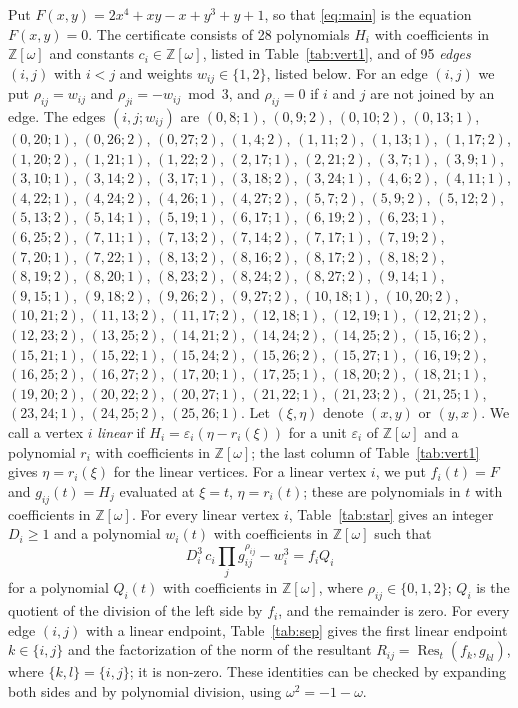 \documentclass[11pt]{article}
\newcommand{\Z}{\mathbb{Z}}
\begin{document}
Put $F(x,y)=2x^{4}+xy-x+y^{3}+y+1$, so that \eqref{eq:main} is the equation $F(x,y)=0$. The certificate consists of 28 polynomials $H_i$ with coefficients in $\Z[\omega]$ and constants $c_i\in\Z[\omega]$, listed in Table~\ref{tab:vert1}, and of 95 \emph{edges} $(i,j)$ with $i<j$ and weights $w_{ij}\in\{1,2\}$, listed below. For an edge $(i,j)$ we put $\rho_{ij}=w_{ij}$ and $\rho_{ji}=-w_{ij}\bmod 3$, and $\rho_{ij}=0$ if $i$ and $j$ are not joined by an edge.
The edges $(i,j;w_{ij})$ are $(0,8;1)$, $(0,9;2)$, $(0,10;2)$, $(0,13;1)$, $(0,20;1)$, $(0,26;2)$, $(0,27;2)$, $(1,4;2)$, $(1,11;2)$, $(1,13;1)$, $(1,17;2)$, $(1,20;2)$, $(1,21;1)$, $(1,22;2)$, $(2,17;1)$, $(2,21;2)$, $(3,7;1)$, $(3,9;1)$, $(3,10;1)$, $(3,14;2)$, $(3,17;1)$, $(3,18;2)$, $(3,24;1)$, $(4,6;2)$, $(4,11;1)$, $(4,22;1)$, $(4,24;2)$, $(4,26;1)$, $(4,27;2)$, $(5,7;2)$, $(5,9;2)$, $(5,12;2)$, $(5,13;2)$, $(5,14;1)$, $(5,19;1)$, $(6,17;1)$, $(6,19;2)$, $(6,23;1)$, $(6,25;2)$, $(7,11;1)$, $(7,13;2)$, $(7,14;2)$, $(7,17;1)$, $(7,19;2)$, $(7,20;1)$, $(7,22;1)$, $(8,13;2)$, $(8,16;2)$, $(8,17;2)$, $(8,18;2)$, $(8,19;2)$, $(8,20;1)$, $(8,23;2)$, $(8,24;2)$, $(8,27;2)$, $(9,14;1)$, $(9,15;1)$, $(9,18;2)$, $(9,26;2)$, $(9,27;2)$, $(10,18;1)$, $(10,20;2)$, $(10,21;2)$, $(11,13;2)$, $(11,17;2)$, $(12,18;1)$, $(12,19;1)$, $(12,21;2)$, $(12,23;2)$, $(13,25;2)$, $(14,21;2)$, $(14,24;2)$, $(14,25;2)$, $(15,16;2)$, $(15,21;1)$, $(15,22;1)$, $(15,24;2)$, $(15,26;2)$, $(15,27;1)$, $(16,19;2)$, $(16,25;2)$, $(16,27;2)$, $(17,20;1)$, $(17,25;1)$, $(18,20;2)$, $(18,21;1)$, $(19,20;2)$, $(20,22;2)$, $(20,27;1)$, $(21,22;1)$, $(21,23;2)$, $(21,25;1)$, $(23,24;1)$, $(24,25;2)$, $(25,26;1)$.
Let $(\xi,\eta)$ denote $(x,y)$ or $(y,x)$. We call a vertex $i$ \emph{linear} if $H_i=\varepsilon_i(\eta-r_i(\xi))$ for a unit $\varepsilon_i$ of $\Z[\omega]$ and a polynomial $r_i$ with coefficients in $\Z[\omega]$; the last column of Table~\ref{tab:vert1} gives $\eta=r_i(\xi)$ for the linear vertices. For a linear vertex $i$, we put $f_i(t)=F$ and $g_{ij}(t)=H_j$ evaluated at $\xi=t$, $\eta=r_i(t)$; these are polynomials in $t$ with coefficients in $\Z[\omega]$.
For every linear vertex $i$, Table~\ref{tab:star} gives an integer $D_i\geq1$ and a polynomial $w_i(t)$ with coefficients in $\Z[\omega]$ such that
\begin{equation}\label{eq:starlin}
D_i^3\,c_i\prod_jg_{ij}^{\rho_{ij}}-w_i^3=f_iQ_i
\end{equation}
for a polynomial $Q_i(t)$ with coefficients in $\Z[\omega]$, where $\rho_{ij}\in\{0,1,2\}$; $Q_i$ is the quotient of the division of the left side by $f_i$, and the remainder is zero.
For every edge $(i,j)$ with a linear endpoint, Table~\ref{tab:sep} gives the first linear endpoint $k\in\{i,j\}$ and the factorization of the norm of the resultant $R_{ij}=\operatorname{Res}_t(f_k,g_{kl})$, where $\{k,l\}=\{i,j\}$; it is non-zero.
These identities can be checked by expanding both sides and by polynomial division, using $\omega^2=-1-\omega$.
\end{document}
